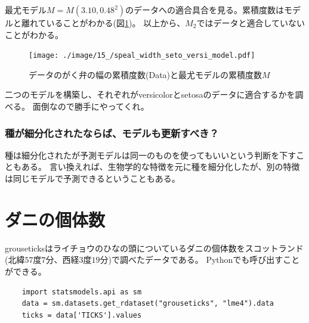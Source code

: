 最尤モデル$M=M(3.10,0.48^2)$のデータへの適合具合を見る。累積度数はモデルと離れていることがわかる(図\ref{fig:speal_width_setosa_versi_model})。
以上から、$M_2$ではデータと適合していないことがわかる。


\begin{figure}
    \begin{center}
        \texttt{[image: ./image/15\_/speal\_width\_seto\_versi\_model.pdf]}
        \caption{データのがく弁の幅の累積度数(Data)と最尤モデルの累積度数$M$}
        \label{fig:speal_width_setosa_versi_model}
    \end{center}
\end{figure}


二つのモデルを構築し、それぞれがversicolorとsetosaのデータに適合するかを調べる。
面倒なので勝手にやってくれ。


\subsubsection{種が細分化されたならば、モデルも更新すべき？}
種は細分化されたが予測モデルは同一のものを使ってもいいという判断を下すこともある。
言い換えれば、生物学的な特徴を元に種を細分化したが、別の特徴は同じモデルで予測できるということもある。


\section{ダニの個体数}
grouseticksはライチョウのひなの頭についているダニの個体数をスコットランド(北緯$57$度$7$分、西経$3$度$19$分)で調べたデータである。
Pythonでも呼び出すことができる。

\begin{lstlisting}
    import statsmodels.api as sm
    data = sm.datasets.get_rdataset("grouseticks", "lme4").data
    ticks = data['TICKS'].values
\end{lstlisting}

